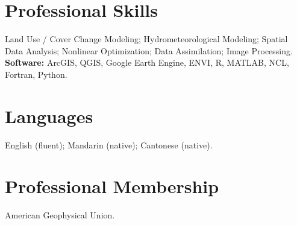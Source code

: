 \documentclass[11pt,letterpaper]{article}
\begin{document}
\section{Professional Skills}
Land Use / Cover Change Modeling; Hydrometeorological Modeling; Spatial Data Analysis; Nonlinear Optimization; Data Assimilation; Image Processing.\\
\textbf{Software:} ArcGIS, QGIS, Google Earth Engine, ENVI, R, MATLAB, NCL, Fortran, Python.

\section{Languages}
English (fluent); Mandarin (native); Cantonese (native).

\section{Professional Membership}
American Geophysical Union.
\end{document}
